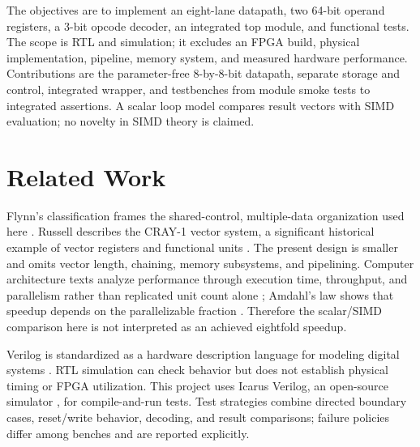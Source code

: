 \documentclass[conference]{IEEEtran}
\begin{document}
The objectives are to implement an eight-lane datapath, two 64-bit operand registers, a 3-bit opcode decoder, an integrated top module, and functional tests. The scope is RTL and simulation; it excludes an FPGA build, physical implementation, pipeline, memory system, and measured hardware performance. Contributions are the parameter-free 8-by-8-bit datapath, separate storage and control, integrated wrapper, and testbenches from module smoke tests to integrated assertions. A scalar loop model compares result vectors with SIMD evaluation; no novelty in SIMD theory is claimed.
\section{Related Work}
Flynn's classification frames the shared-control, multiple-data organization used here \cite{flynn1972}. Russell describes the CRAY-1 vector system, a significant historical example of vector registers and functional units \cite{russell1978}. The present design is smaller and omits vector length, chaining, memory subsystems, and pipelining. Computer architecture texts analyze performance through execution time, throughput, and parallelism rather than replicated unit count alone \cite{hennessy2017}; Amdahl's law shows that speedup depends on the parallelizable fraction \cite{amdahl1967}. Therefore the scalar/SIMD comparison here is not interpreted as an achieved eightfold speedup.

Verilog is standardized as a hardware description language for modeling digital systems \cite{ieee1364}. RTL simulation can check behavior but does not establish physical timing or FPGA utilization. This project uses Icarus Verilog, an open-source simulator \cite{icarus}, for compile-and-run tests. Test strategies combine directed boundary cases, reset/write behavior, decoding, and result comparisons; failure policies differ among benches and are reported explicitly.
\end{document}
